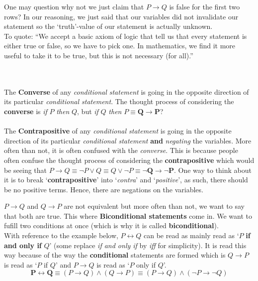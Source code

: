 \documentclass[../setup.tex]{subfiles}
\begin{document}
\begin{remark}
One may question why not we just claim that $P\rightarrow Q$ is false for the first two rows? In our reasoning, we just said that our variables did not invalidate our statement so the `truth'-value of our statement is actually unknown. \\ To quote: ``We accept a basic axiom of logic that tell us that every statement is either true or false, so we have to pick one. In mathematics, we find it more useful to take it to be true, but this is not necessary (for all).'' 
\end{remark}
\phantom \\ \\
The \textbf{Converse} of any \textit{conditional statement} is going in the opposite direction of its particular \textit{conditional statement}. The thought process of considering the \textbf{converse} is \textit{if} $P$ \textit{then} $Q$, but \textit{if} $Q$ \textit{then} $P \equiv \boldsymbol{Q \rightarrow P}$?\\
\\
The \textbf{Contrapositive} of any \textit{conditional statement} is going in the opposite direction of its particular \textit{conditional statement} \textbf{and} \textit{negating} the variables. More often than not, it is often confused with the \textit{converse}. This is because people often confuse the thought process of considering the \textbf{contrapositive} which would be seeing that $P \rightarrow Q \equiv \lnot P\lor Q \equiv Q \lor\lnot P \equiv \boldsymbol{\lnot Q \rightarrow \lnot P}$. One way to think about it is to break `\textbf{contrapositive}' into `\textit{contra}' and `\textit{positive}', as such, there should be no positive terms. Hence, there are negations on the variables.

\begin{theorem}
$P \rightarrow Q$ and $Q \rightarrow P$ are not equivalent but more often than not, we want to say that both are true. This where \textbf{Biconditional statements} come in. We want to fufill two conditions at once (which is why it is called \textbf{biconditional}). \\
With reference to the example below, $P \longleftrightarrow Q$ can be read as mainly read as `$P$ \textbf{if and only if} $Q$' (some replace \textit{if and only if} by \textit{iff} for simplicity). It is read this way because of the way the \textbf{conditional} statements are formed which is  $Q \rightarrow P$ is read as `$P$ if $Q$' and $P \rightarrow Q$ is read as `$P$ only if $Q$'.
\[ \boldsymbol{P \longleftrightarrow Q} \equiv (P \rightarrow Q) \land (Q \rightarrow P) \equiv (P \rightarrow Q) \land (\lnot P \rightarrow \lnot Q)\]
\end{theorem}
\end{document}
